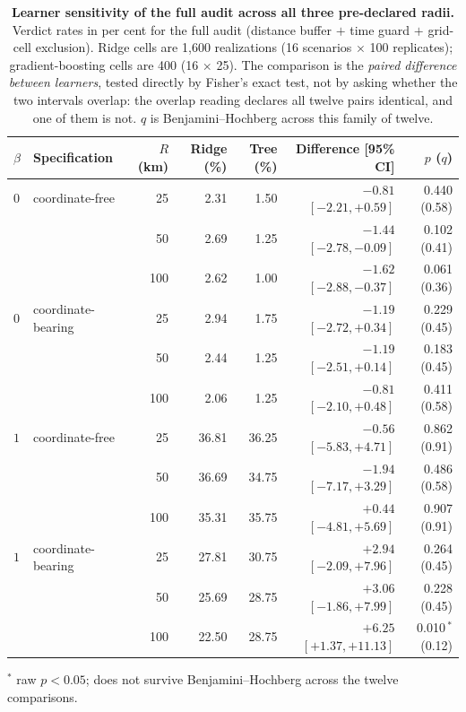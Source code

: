 \documentclass[11pt]{article}
\begin{document}
\begin{table}[htbp]\centering\footnotesize
\caption{\textbf{Learner sensitivity of the full audit across all three pre-declared radii.} Verdict rates in per cent for the full audit (distance buffer $+$ time guard $+$ grid-cell exclusion). Ridge cells are 1{,}600 realizations (16 scenarios $\times$ 100 replicates); gradient-boosting cells are 400 (16 $\times$ 25). The comparison is the \emph{paired difference between learners}, tested directly by Fisher's exact test, not by asking whether the two intervals overlap: the overlap reading declares all twelve pairs identical, and one of them is not. $q$ is Benjamini--Hochberg across this family of twelve.}
\label{tab:learner3r}
\begin{tabular}{llrrrrr}\toprule
$\beta$ & Specification & $R$ (km) & Ridge (\%) & Tree (\%) & Difference [95\% CI] & $p$ \quad ($q$) \\ \midrule
$0$ & coordinate-free & 25 & 2.31 & 1.50 & $-0.81$ $[-2.21, +0.59]$ & 0.440 \quad (0.58) \\
 &  & 50 & 2.69 & 1.25 & $-1.44$ $[-2.78, -0.09]$ & 0.102 \quad (0.41) \\
 &  & 100 & 2.62 & 1.00 & $-1.62$ $[-2.88, -0.37]$ & 0.061 \quad (0.36) \\
\addlinespace
$0$ & coordinate-bearing & 25 & 2.94 & 1.75 & $-1.19$ $[-2.72, +0.34]$ & 0.229 \quad (0.45) \\
 &  & 50 & 2.44 & 1.25 & $-1.19$ $[-2.51, +0.14]$ & 0.183 \quad (0.45) \\
 &  & 100 & 2.06 & 1.25 & $-0.81$ $[-2.10, +0.48]$ & 0.411 \quad (0.58) \\
\addlinespace
$1$ & coordinate-free & 25 & 36.81 & 36.25 & $-0.56$ $[-5.83, +4.71]$ & 0.862 \quad (0.91) \\
 &  & 50 & 36.69 & 34.75 & $-1.94$ $[-7.17, +3.29]$ & 0.486 \quad (0.58) \\
 &  & 100 & 35.31 & 35.75 & $+0.44$ $[-4.81, +5.69]$ & 0.907 \quad (0.91) \\
\addlinespace
$1$ & coordinate-bearing & 25 & 27.81 & 30.75 & $+2.94$ $[-2.09, +7.96]$ & 0.264 \quad (0.45) \\
 &  & 50 & 25.69 & 28.75 & $+3.06$ $[-1.86, +7.99]$ & 0.228 \quad (0.45) \\
 &  & 100 & 22.50 & 28.75 & $+6.25$ $[+1.37, +11.13]$ & 0.010\,$^{*}$ \quad (0.12) \\
\bottomrule\end{tabular}
\par\smallskip\raggedright\footnotesize $^{*}$ raw $p<0.05$; does not survive Benjamini--Hochberg across the twelve comparisons.
\end{table}
\end{document}
